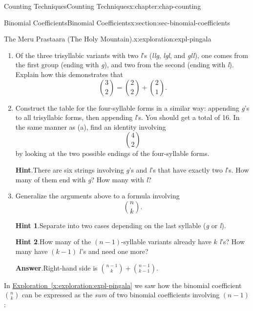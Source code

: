 \documentclass[oneside,10pt,]{book}
\newcommand{\blocktitlefont}{\relax}
\newcommand{\xreffont}{\relax}
\numberwithin{equation}{section}
\begin{document}
\begin{chapterptx}{Counting Techniques}{}{Counting Techniques}{}{}{x:chapter:chap-counting}
\begin{sectionptx}{Binomial Coefficients}{}{Binomial Coefficients}{}{}{x:section:sec-binomial-coefficients}
\begin{exploration}{The Meru Prastaara (The Holy Mountain).}{x:exploration:expl-pingala}
\begin{enumerate}[font=\bfseries,label=(\alph*),ref=\alph*]
\item{}Of the three trisyllabic variants with two \emph{l}'s (\emph{llg}, \emph{lgl}, and \emph{gll}), one comes from the first group (ending with \emph{g}), and two from the second (ending with \emph{l}). Explain how this demonstrates that%
\begin{equation*}
\binom{3}{2} = \binom{2}{2} + \binom{2}{1}\text{.}
\end{equation*}
%
\item{}Construct the table for the four-syllable forms in a similar way: appending \emph{g}'s to all trisyllabic forms, then appending \emph{l}'s. You should get a total of 16. In the same manner as (a), find an identity involving%
\begin{equation*}
\displaystyle\binom{4}{2}
\end{equation*}
by looking at the two possible endings of the four-syllable forms.%
\par\smallskip%
\noindent\textbf{\blocktitlefont Hint}.\hypertarget{g:hint:id525987}{}\quad{}There are six strings involving \emph{g}'s and \emph{l}'s that have exactly two \emph{l}'s. How many of them end with \emph{g}? How many with \emph{l}?%
\item{}Generalize the arguments above to a formula involving%
\begin{equation*}
\binom{n}{k}\text{.}
\end{equation*}
%
\par\smallskip%
\noindent\textbf{\blocktitlefont Hint 1}.\hypertarget{g:hint:id526025}{}\quad{}Separate into two cases depending on the last syllable (\emph{g} or \emph{l}).%
\par\smallskip%
\noindent\textbf{\blocktitlefont Hint 2}.\hypertarget{g:hint:id526022}{}\quad{}How many of the \((n-1)\)-syllable variants already have \(k\) \emph{l}'s? How many have \((k-1)\) \(l\)'s and need one more?%
\par\smallskip%
\noindent\textbf{\blocktitlefont Answer}.\hypertarget{g:answer:id526050}{}\quad{}Right-hand side is \(\displaystyle\binom{n-1}{k} + \binom{n-1}{k-1}\).%
\end{enumerate}
\end{exploration}%
In \hyperref[x:exploration:expl-pingala]{Exploration~{\xreffont\ref{x:exploration:expl-pingala}}} we saw how the binomial coefficient \(\displaystyle\binom{n}{k}\) can be expressed as the \emph{sum} of two binomial coefficients involving \((n-1)\):%

\end{sectionptx}
\end{chapterptx}
\end{document}
